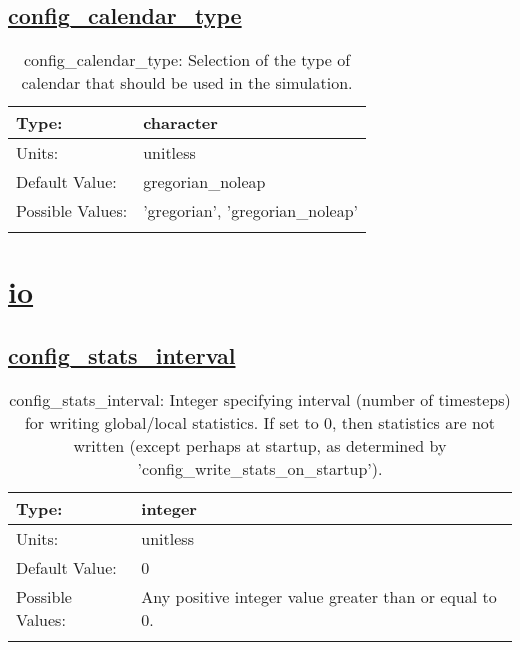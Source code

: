 \subsection[config\_calendar\_type]{\hyperref[sec:nm_tab_time_management]{config\_calendar\_type}}
\label{subsec:nm_sec_config_calendar_type}
\begin{center}
\begin{longtable}{| p{2.0in} || p{4.0in} |}
    \hline
    Type: & character \\
    \hline
    Units: & \si{unitless} \\
    \hline
    Default Value: & gregorian\_noleap \\
    \hline
    Possible Values: & 'gregorian', 'gregorian\_noleap' \\
    \hline
    \caption{config\_calendar\_type: Selection of the type of calendar that should be used in the simulation.}
\end{longtable}
\end{center}
\section[io]{\hyperref[sec:nm_tab_io]{io}}
\label{sec:nm_sec_io}
\subsection[config\_stats\_interval]{\hyperref[sec:nm_tab_io]{config\_stats\_interval}}
\label{subsec:nm_sec_config_stats_interval}
\begin{center}
\begin{longtable}{| p{2.0in} || p{4.0in} |}
    \hline
    Type: & integer \\
    \hline
    Units: & \si{unitless} \\
    \hline
    Default Value: & 0 \\
    \hline
    Possible Values: & Any positive integer value greater than or equal to 0. \\
    \hline
    \caption{config\_stats\_interval: Integer specifying interval (number of timesteps) for writing global/local statistics. If set to 0, then statistics are not written (except perhaps at startup, as determined by 'config\_write\_stats\_on\_startup').}
\end{longtable}
\end{center}
